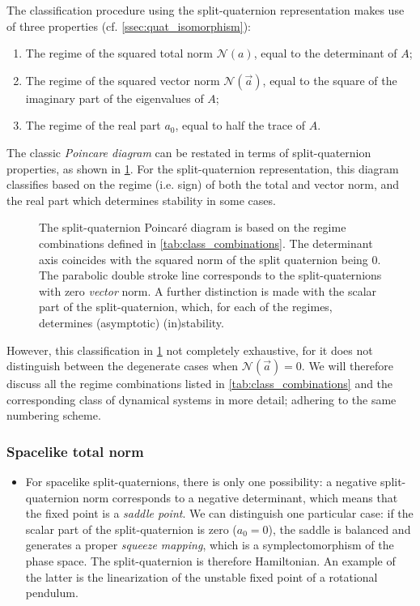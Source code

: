 The classification procedure using the split-quaternion representation makes use of three properties (cf. \cref{ssec:quat_isomorphism}): 
\begin{enumerate}[label=(\roman*), align=left, leftmargin=1.5cm]
    \item The regime of the squared total norm $\mathscr{N}(a)$, equal to the determinant of $A$;
    \item The regime of the squared vector norm $\mathscr{N}(\vec{a})$, equal to the square of the imaginary part of the eigenvalues of $A$;
    \item The regime of the real part $a_0$, equal to half the trace of $A$.
\end{enumerate}
The classic \emph{Poincare diagram} can be restated in terms of split-quaternion properties, as shown in \cref{fig:poincare_diagram}. For the split-quaternion representation, this diagram classifies based on the regime (i.e. sign) of both the total and vector norm, and the real part which determines stability in some cases.

\begin{figure}[ht!]
    \centering
    
    \caption{The split-quaternion Poincaré diagram is based on the regime combinations defined in \cref{tab:class_combinations}. The determinant axis coincides with the squared norm of the split quaternion being 0. The parabolic double stroke line corresponds to the split-quaternions with zero \emph{vector} norm. 
    A further distinction is made with the scalar part of the split-quaternion, which, for each of the regimes, determines (asymptotic) (in)stability.}
    \label{fig:poincare_diagram}
\end{figure}

However, this classification in \cref{fig:poincare_diagram} not completely exhaustive, for it does not distinguish between the degenerate cases when $\mathscr{N}(\vec{a}) = 0$.
We will therefore discuss all the regime combinations listed in \cref{tab:class_combinations} and the corresponding class of dynamical systems in more detail; adhering to the same numbering scheme.

\subsubsection*{Spacelike total norm}
    \begin{itemize}
        \item[\circled{1}] For spacelike split-quaternions, there is only one possibility: a negative split-quaternion norm corresponds to a negative determinant, which means that the fixed point is a \emph{saddle point}. We can distinguish one particular case: if the scalar part of the split-quaternion is zero (\(a_0 = 0\)), the saddle is balanced and generates a proper \emph{squeeze mapping}, which is a symplectomorphism of the phase space. The split-quaternion is therefore Hamiltonian. An example of the latter is the linearization of the unstable fixed point of a rotational pendulum.
    \end{itemize}

